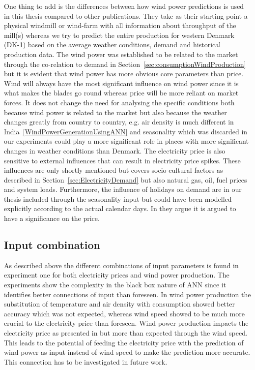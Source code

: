 One thing to add is the differences between how wind power predictions is used in this thesis compared to other publications. They take as their starting point a physical windmill or wind-farm with all information about throughput of the mill(s)\cite{windForecastPortugal,ShortTermWindPowerForecasting,dayAheadImpactOfWindPowerForecasts,WindPowerGenerationUsingANN} whereas we try to predict the entire production for western Denmark (DK-1) based on the average weather conditions, demand and historical production data. The wind power was established to be related to the market through the co-relation to demand in Section~\ref{sec:consumptionWindProduction} but it is evident that wind power has more obvious core parameters than price. Wind will always have the most significant influence on wind power since it is what makes the blades go round whereas price will be more reliant on market forces. It does not change the need for analysing the specific conditions both because wind power is related to the market but also because the weather changes greatly from country to country, e.g. air density is much different in India~\ref{WindPowerGenerationUsingANN} and seasonality which was discarded in our experiments could play a more significant role in places with more significant changes in weather conditions than Denmark. The electricity price is also sensitive to external influences that can result in electricity price spikes\cite{singhal2011electricity}. These influences are only shortly mentioned but covers socio-cultural factors as described in Section~\ref{sec:ElectricityDemand} but also natural gas, oil, fuel prices and system loads\cite{singhal2011electricity}. Furthermore, the influence of holidays on demand are in our thesis included through the seasonality input but could have been modelled explicitly according to the actual calendar days. In \cite{EnergyPriceForecasting,chen2004load} they argue it is argued to have a significance on the price.

\subsection{Input combination}
As described above the different combinations of input parameters is found in experiment one for both electricity prices and wind power production. The experiments show the complexity in the black box nature of ANN since it identifies better connections of input than foreseen. In wind power production the substitution of temperature and air density with consumption showed better accuracy which was not expected, whereas wind speed showed to be much more crucial to the electricity price than foreseen. Wind power production impacts the electricity price as presented in \cite{dayAheadImpactOfWindPowerForecasts} but more than expected through the wind speed. This leads to the potential of feeding the electricity price with the prediction of wind power as input instead of wind speed to make the prediction more accurate. This connection has to be investigated in future work.

